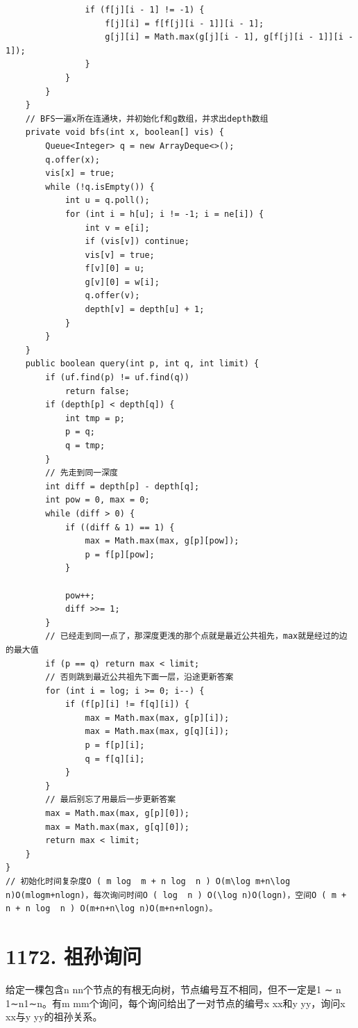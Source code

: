 \documentclass[9pt, b5paaper]{book}
\begin{document}
\begin{verbatim}
                if (f[j][i - 1] != -1) {
                    f[j][i] = f[f[j][i - 1]][i - 1];
                    g[j][i] = Math.max(g[j][i - 1], g[f[j][i - 1]][i - 1]);
                }
            }
        }
    }
    // BFS一遍x所在连通块，并初始化f和g数组，并求出depth数组
    private void bfs(int x, boolean[] vis) {
        Queue<Integer> q = new ArrayDeque<>();
        q.offer(x);
        vis[x] = true;
        while (!q.isEmpty()) {
            int u = q.poll();
            for (int i = h[u]; i != -1; i = ne[i]) {
                int v = e[i];
                if (vis[v]) continue;
                vis[v] = true;
                f[v][0] = u;
                g[v][0] = w[i];
                q.offer(v);
                depth[v] = depth[u] + 1;
            }
        }
    }
    public boolean query(int p, int q, int limit) {
        if (uf.find(p) != uf.find(q)) 
            return false;
        if (depth[p] < depth[q]) {
            int tmp = p;
            p = q;
            q = tmp;
        }
        // 先走到同一深度
        int diff = depth[p] - depth[q];
        int pow = 0, max = 0;
        while (diff > 0) {
            if ((diff & 1) == 1) {
                max = Math.max(max, g[p][pow]);
                p = f[p][pow];
            }

            pow++;
            diff >>= 1;
        }
        // 已经走到同一点了，那深度更浅的那个点就是最近公共祖先，max就是经过的边的最大值
        if (p == q) return max < limit;
        // 否则跳到最近公共祖先下面一层，沿途更新答案
        for (int i = log; i >= 0; i--) {
            if (f[p][i] != f[q][i]) {
                max = Math.max(max, g[p][i]);
                max = Math.max(max, g[q][i]);
                p = f[p][i];
                q = f[q][i];
            }
        }
        // 最后别忘了用最后一步更新答案
        max = Math.max(max, g[p][0]);
        max = Math.max(max, g[q][0]);
        return max < limit;
    }
}
// 初始化时间复杂度O ( m log ⁡ m + n log ⁡ n ) O(m\log m+n\log n)O(mlogm+nlogn)，每次询问时间O ( log ⁡ n ) O(\log n)O(logn)，空间O ( m + n + n log ⁡ n ) O(m+n+n\log n)O(m+n+nlogn)。
\end{verbatim}

\section{1172. 祖孙询问}
\label{sec-6-8}
给定一棵包含n nn个节点的有根无向树，节点编号互不相同，但不一定是1 ∼ n 1∼n1∼n。有m mm个询问，每个询问给出了一对节点的编号x xx和y yy，询问x xx与y yy的祖孙关系。
\end{document}
